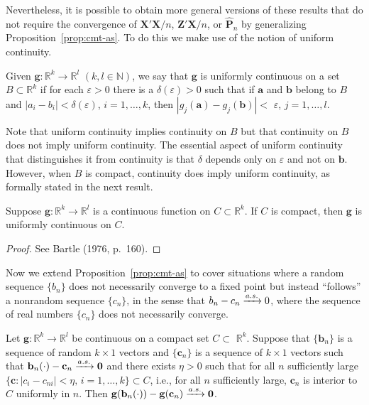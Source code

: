 Nevertheless, it is possible to obtain more general versions of these results
that do not require the convergence of $\mathbf{X}'\mathbf{X}/n$, $\mathbf{Z}'\mathbf{X}/n$, or $\hat{\mathbf{P}}_n$ by generalizing Proposition~\ref{prop:cmt-as}. To do this we make use of the notion of uniform
continuity.

\begin{definition}\label{def:uniform-continuity}
Given $\mathbf{g} : \mathbb{R}^k \to \mathbb{R}^l$ $(k, l \in \mathbb{N})$, we say that $\mathbf{g}$ is uniformly
continuous on a set $B \subset \mathbb{R}^k$ if for each $\varepsilon > 0$ there is a $\delta(\varepsilon) > 0$ such that if
$\mathbf{a}$ and $\mathbf{b}$ belong to $B$ and $|a_i - b_i| < \delta(\varepsilon)$, $i = 1, \ldots, k$, then $|g_j(\mathbf{a}) - g_j(\mathbf{b})| <$
$\varepsilon$, $j = 1, \ldots, l$.
\end{definition}

Note that uniform continuity implies continuity on $B$ but that continuity
on $B$ does not imply uniform continuity. The essential aspect of uniform
continuity that distinguishes it from continuity is that $\delta$ depends only on $\varepsilon$
and not on $\mathbf{b}$. However, when $B$ is compact, continuity does imply uniform
continuity, as formally stated in the next result.

\begin{theorem}\label{thm:uniform-continuity}
Suppose $\mathbf{g} : \mathbb{R}^k \to \mathbb{R}^l$
is a continuous function on $C \subset \mathbb{R}^k$. If $C$ is compact, then $\mathbf{g}$ is uniformly
continuous on $C$.
\end{theorem}

\begin{proof}
See Bartle (1976, p.\ 160).
\end{proof}

Now we extend Proposition~\ref{prop:cmt-as} to cover situations where a random
sequence $\{b_n\}$ does not necessarily converge to a fixed point but instead
``follows'' a nonrandom sequence $\{c_n\}$, in the sense that $b_n - c_n \xrightarrow{a.s.} 0$,
where the sequence of real numbers $\{c_n\}$ does not necessarily converge.

\begin{proposition}\label{prop:cmt-as-general}
Let $\mathbf{g} : \mathbb{R}^k \to \mathbb{R}^l$ be continuous on a compact set $C \subset$
$\mathbb{R}^k$. Suppose that $\{\mathbf{b}_n\}$ is a sequence of random $k \times 1$ vectors and $\{\mathbf{c}_n\}$ is a
sequence of $k \times 1$ vectors such that $\mathbf{b}_n(\cdot) - \mathbf{c}_n \xrightarrow{a.s.} \mathbf{0}$ and there exists $\eta > 0$
such that for all $n$ sufficiently large $\{\mathbf{c} : |c_i - c_{ni}| < \eta, \, i = 1, \ldots, k\} \subset C$,
i.e., for all $n$ sufficiently large, $\mathbf{c}_n$ is interior to $C$ uniformly in $n$. Then
$\mathbf{g}(\mathbf{b}_n(\cdot)) - \mathbf{g}(\mathbf{c}_n) \xrightarrow{a.s.} \mathbf{0}$.
\end{proposition}

